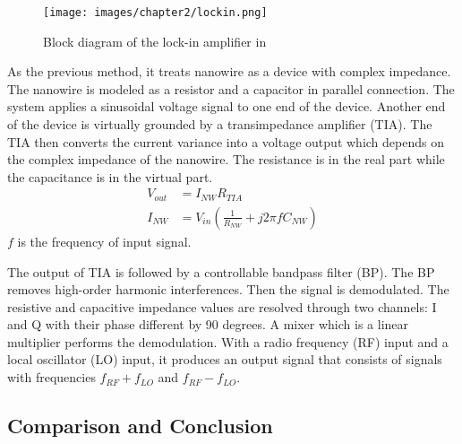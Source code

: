 \begin{figure}[!htbp]
        \centering
        \texttt{[image: images/chapter2/lockin.png]}
        \caption{Block diagram of the lock-in amplifier in \cite{Jlockin}}
        \label{fig:lockin}
\end{figure}

As the previous method, it treats nanowire as a device with complex impedance.
The nanowire is modeled as a resistor and a capacitor in parallel connection.
The system applies a sinusoidal voltage signal to one end of the device.
Another end of the device is virtually grounded by a transimpedance amplifier (TIA).
The TIA then converts the current variance into a voltage output which depends on the complex impedance of the nanowire.
The resistance is in the real part while the capacitance is in the virtual part.
\setlength{\mathindent}{5.5cm}
\begin{align}
    V_{out} &= I_{NW}R_{TIA} \\
    I_{NW} &= V_{in}(\frac{1}{R_{NW}} + j 2\pi fC_{NW})
\end{align}
$f$ is the frequency of input signal.

The output of TIA is followed by a controllable bandpass filter (BP).
The BP removes high-order harmonic interferences.
Then the signal is demodulated.
The resistive and capacitive impedance values are resolved through two channels: I and Q with their phase different by 90 degrees.
A mixer which is a linear multiplier performs the demodulation.
With a radio frequency (RF) input and a local oscillator (LO) input, it produces an output signal that consists of signals with frequencies $f_{RF} + f_{LO}$ and $f_{RF} - f_{LO}$.

\subsection{Comparison and Conclusion} \label{sec:ch2CC}


